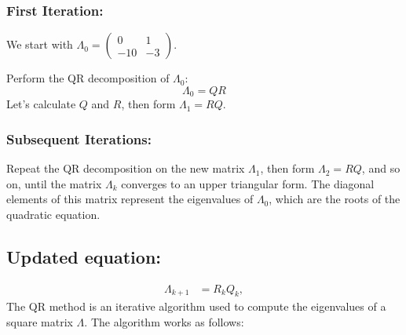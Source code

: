 \documentclass[journal]{IEEEtran}
\begin{document}
\subsubsection*{First Iteration:}
We start with \( \Lambda_0 = \begin{pmatrix} 0 & 1 \\ -10 & -3 \end{pmatrix} \).

Perform the QR decomposition of \( \Lambda_0 \):
\[
\Lambda_0 = QR
\]
Let’s calculate \( Q \) and \( R \), then form \( \Lambda_1 = RQ \).

\subsubsection*{Subsequent Iterations:}
Repeat the QR decomposition on the new matrix \( \Lambda_1 \), then form \( \Lambda_2 = RQ \), and so on, until the matrix \( \Lambda_k \) converges to an upper triangular form. The diagonal elements of this matrix represent the eigenvalues of \( \Lambda_0 \), which are the roots of the quadratic equation.
\subsection*{Updated equation:}
\begin{align}
    \Lambda_{k+1} &= R_k Q_k,
\end{align}
The QR method is an iterative algorithm used to compute the eigenvalues of a square matrix \(\Lambda\). The algorithm works as follows:
\end{document}
